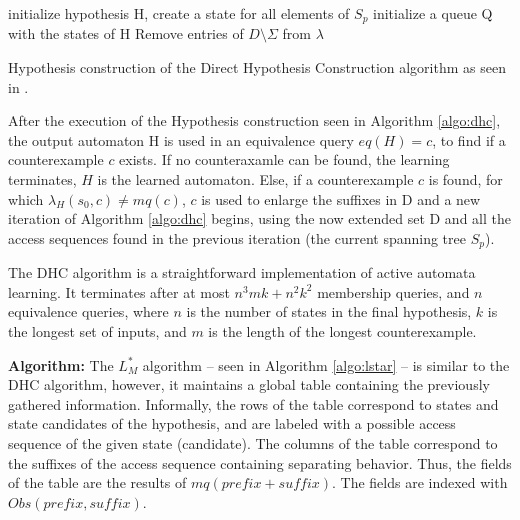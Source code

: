 \begin{algorithm}[H]
	\SetAlgoLined
	\DontPrintSemicolon
	initialize hypothesis H, create a state for all elements of $S_p$\;
	initialize a queue Q with the states of H\;
	Remove entries of $D\setminus\Sigma$ from $\lambda$\;
	\;
	\caption{Hypothesis construction of the Direct Hypothesis Construction algorithm as seen in \cite{Steffen2011}.}
	\label{algo:dhc}
\end{algorithm}

After the execution of the Hypothesis construction seen in Algorithm \ref{algo:dhc}, the output automaton H is used in an equivalence query $eq(H) = c$, to find if a counterexample $c$ exists. If no counteraxamle can be found, the learning terminates, $H$ is the learned automaton. Else, if a counterexample $c$ is found, for which $\lambda_H(s_0,c) \neq mq(c)$, $c$ is used to enlarge the suffixes in D and a new iteration of Algorithm \ref{algo:dhc} begins, using the now extended set D and all the access sequences found in the previous iteration (the current spanning tree $S_p$).

The DHC algorithm is a straightforward implementation of active automata learning. It terminates after at most $n^3mk+n^2k^2$ membership queries, and $n$ equivalence queries, where $n$ is the number of states in the final hypothesis, $k$ is the longest set of inputs, and $m$ is the length of the longest counterexample\cite{10.1007/978-3-642-34781-8_19}.



 \textbf{Algorithm:}
\unboldmath
The $L^*_M$ algorithm -- seen in Algorithm \ref{algo:lstar} -- is similar to the DHC algorithm, however, it maintains a global table containing the previously gathered information. Informally, the rows of the table correspond to states and state candidates of the hypothesis, and are labeled with a possible access sequence of the given state (candidate). The columns of the table correspond to the suffixes of the access sequence containing separating behavior. Thus, the fields of the table are the results of $mq(prefix + suffix)$. The fields are indexed with $Obs(prefix, suffix)$.

